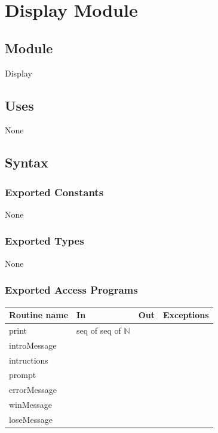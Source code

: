 \documentclass[12pt]{article}
\newcommand{\authornote}[3]{\textcolor{#1}{[#3 ---#2]}}
\newcommand{\authornote}[3]{}
\newcommand{\wss}[1]{\authornote{blue}{SS}{#1}}
\begin{document}


% 
% 

\newpage

\section* {Display Module}

\subsection*{Module}

Display

\subsection* {Uses}

None

\subsection* {Syntax}

\subsubsection* {Exported Constants}

None

\subsubsection* {Exported Types}

None

\subsubsection* {Exported Access Programs}

\begin{tabular}{| l | l | l | p{5cm} |}
\hline
\textbf{Routine name} & \textbf{In} & \textbf{Out} & \textbf{Exceptions}\\
\hline
print & seq of seq of $\mathbb{N}$ & & \\
\hline
introMessage & & & \\
\hline
intructions & & & \\
\hline
prompt & & & \\
\hline
errorMessage & & & \\
\hline
winMessage & & & \\
\hline
loseMessage & & & \\
\hline
\end{tabular}
\end{document}
